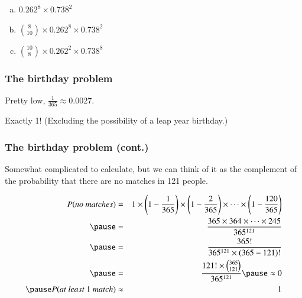 
\begin{frame}


\begin{enumerate}[(a)]
\item $0.262^8 \times 0.738^2$
\item ${8 \choose 10} \times 0.262^8 \times 0.738^2$
 
\item ${10 \choose 8} \times 0.262^2 \times 0.738^8$
\end{enumerate}



\end{frame}


\begin{frame}
\frametitle{The birthday problem}


\pause

Pretty low, $\frac{1}{365} \approx 0.0027$.

\pause


\pause

Exactly 1! (Excluding the possibility of a leap year birthday.)

\end{frame}


\begin{frame}
\frametitle{The birthday problem (cont.)}


\pause

Somewhat complicated to calculate, but we can think of it as the complement of the probability that there are no matches in 121 people.

\vspace{-0.75cm}

\begin{eqnarray*}
P(no~matches) &=& 1 \times \pr{1 - \frac{1}{365}} \times \pr{1 - \frac{2}{365}} \times \cdots \times \pr{1 - \frac{120}{365}} \\
\pause
&=& \frac{365 \times 364 \times \cdots \times 245}{365^{121}} \\
\pause
&=& \frac{365!}{365^{121} \times (365-121)!} \\
\pause
&=& \frac{121! \times {365 \choose 121}}{365^{121}} 
\pause
\approx 0 \\
\pause
P(at~least~1~match) &\approx& 1
\end{eqnarray*}

\end{frame}


